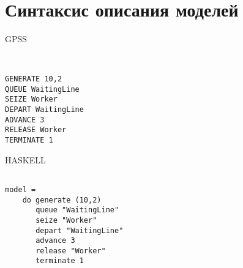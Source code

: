 \documentclass[12pt]{article}
\begin{document}
\section{Синтаксис описания моделей}

\begin{minipage}[m]{.49\textwidth}
\centerline{GPSS}

\begin{verbatim}


GENERATE 10,2
QUEUE WaitingLine
SEIZE Worker
DEPART WaitingLine
ADVANCE 3
RELEASE Worker
TERMINATE 1

\end{verbatim}


\end{minipage}
%
\begin{minipage}[m]{.49\textwidth}
\vspace{1cm}
\centerline{HASKELL}

\begin{verbatim}

model = 
    do generate (10,2)
       queue "WaitingLine"
       seize "Worker"
       depart "WaitingLine"
       advance 3
       release "Worker"
       terminate 1

\end{verbatim}

\end{minipage}
\end{document}
